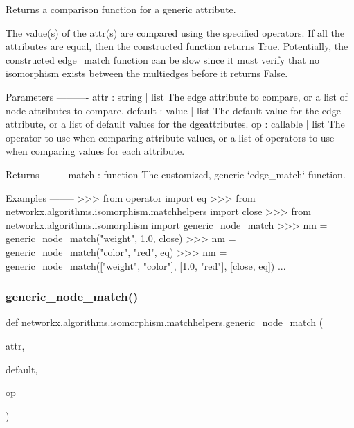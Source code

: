 \begin{DoxyVerb}Returns a comparison function for a generic attribute.

The value(s) of the attr(s) are compared using the specified
operators. If all the attributes are equal, then the constructed
function returns True. Potentially, the constructed edge_match
function can be slow since it must verify that no isomorphism
exists between the multiedges before it returns False.

Parameters
----------
attr : string | list
    The edge attribute to compare, or a list of node attributes
    to compare.
default : value | list
    The default value for the edge attribute, or a list of
    default values for the dgeattributes.
op : callable | list
    The operator to use when comparing attribute values, or a list
    of operators to use when comparing values for each attribute.

Returns
-------
match : function
    The customized, generic `edge_match` function.

Examples
--------
>>> from operator import eq
>>> from networkx.algorithms.isomorphism.matchhelpers import close
>>> from networkx.algorithms.isomorphism import generic_node_match
>>> nm = generic_node_match("weight", 1.0, close)
>>> nm = generic_node_match("color", "red", eq)
>>> nm = generic_node_match(["weight", "color"], [1.0, "red"], [close, eq])
...\end{DoxyVerb}
 \mbox{\label{namespacenetworkx_1_1algorithms_1_1isomorphism_1_1matchhelpers_a3641189500aeeb4cb970a3b23988b0b3}} 
\subsubsection{\texorpdfstring{generic\+\_\+node\+\_\+match()}{generic\_node\_match()}}
{\footnotesize\ttfamily def networkx.\+algorithms.\+isomorphism.\+matchhelpers.\+generic\+\_\+node\+\_\+match (\begin{DoxyParamCaption}\item[{}]{attr,  }\item[{}]{default,  }\item[{}]{op }\end{DoxyParamCaption})}

